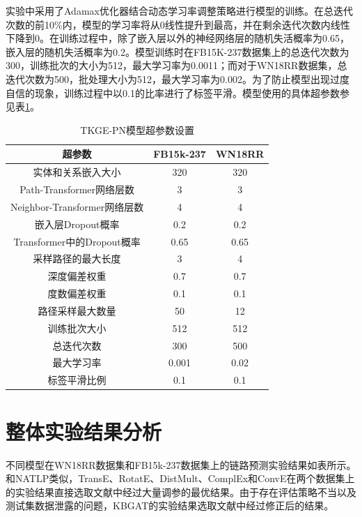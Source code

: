 实验中采用了Adamax优化器结合动态学习率调整策略进行模型的训练。在总迭代次数的前10\%内，模型的学习率将从0线性提升到最高，并在剩余迭代次数内线性下降到0。在训练过程中，除了嵌入层以外的神经网络层的随机失活概率为0.65，嵌入层的随机失活概率为0.2。模型训练时在FB15K-237数据集上的总迭代次数为300，训练批次的大小为512，最大学习率为0.0011；而对于WN18RR数据集，总迭代次数为500，批处理大小为512，最大学习率为0.002。为了防止模型出现过度自信的现象，训练过程中以0.1的比率进行了标签平滑。模型使用的具体超参数参见表\ref{TKGE-PN_hyperparameter}。

\begin{table}[htbp]
    \renewcommand\arraystretch{1.5}
    \caption{TKGE-PN模型超参数设置}
    \centering
    \begin{tabular}{*{3}{c}}
      \toprule
      超参数 & FB15k-237 & WN18RR\\
      \midrule
      实体和关系嵌入大小  & 320 & 320 \\
      Path-Transformer网络层数& 3 & 3\\
      Neighbor-Transformer网络层数& 4 & 4\\
      嵌入层Dropout概率 & 0.2 & 0.2\\
      Transformer中的Dropout概率 & 0.65 & 0.65\\
      采样路径的最大长度&3 &4\\
      深度偏差权重& 0.7 & 0.7\\
      度数偏差权重& 0.1 & 0.1\\
      路径采样最大数量 &50&12\\
      训练批次大小 & 512 & 512\\
      总迭代次数& 300 & 500 \\
      最大学习率 & 0.001 & 0.02\\
      标签平滑比例 & 0.1 & 0.1\\
      \bottomrule
    \end{tabular}
    \label{TKGE-PN_hyperparameter}
  \end{table}

\section{整体实验结果分析}

不同模型在WN18RR数据集和FB15k-237数据集上的链路预测实验结果如表所示。和NATLP类似，TransE、RotatE、DistMult、ComplEx和ConvE在两个数据集上的实验结果直接选取文献\cite{49}中经过大量调参的最优结果。由于存在评估策略不当以及测试集数据泄露的问题，KBGAT的实验结果选取文献\cite{50}中经过修正后的结果。

